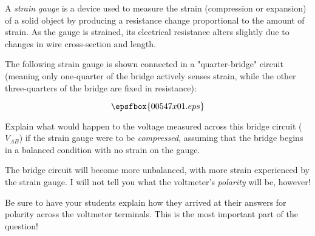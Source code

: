 

A {\it strain gauge} is a device used to measure the strain (compression or expansion) of a solid object by producing a resistance change proportional to the amount of strain.  As the gauge is strained, its electrical resistance alters slightly due to changes in wire cross-section and length.

The following strain gauge is shown connected in a "quarter-bridge" circuit (meaning only one-quarter of the bridge actively senses strain, while the other three-quarters of the bridge are fixed in resistance):

$$\epsfbox{00547x01.eps}$$

Explain what would happen to the voltage measured across this bridge circuit ($V_{AB}$) if the strain gauge were to be {\it compressed}, assuming that the bridge begins in a balanced condition with no strain on the gauge.







The bridge circuit will become more unbalanced, with more strain experienced by the strain gauge.  I will not tell you what the voltmeter's {\it polarity} will be, however!







Be sure to have your students explain how they arrived at their answers for polarity across the voltmeter terminals.  This is the most important part of the question!




